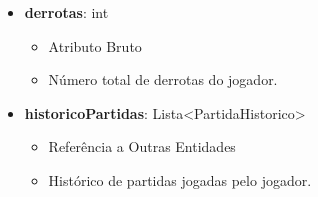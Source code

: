 \begin{itemize}
        \item \textbf{derrotas}: int  
              \begin{itemize}
                  \item Atributo Bruto
                  \item Número total de derrotas do jogador.
              \end{itemize}
    
        \item \textbf{historicoPartidas}: Lista\textless PartidaHistorico\textgreater  
              \begin{itemize}
                  \item Referência a Outras Entidades
                  \item Histórico de partidas jogadas pelo jogador.
              \end{itemize}
    \end{itemize}
    
